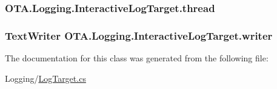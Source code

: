 \subsubsection[{thread}]{ O\+T\+A.\+Logging.\+Interactive\+Log\+Target.\+thread\hspace{0.3cm}{\ttfamily [protected]}}\label{class_o_t_a_1_1_logging_1_1_interactive_log_target_a9575af8474322f89afa9bcc6618d8b48}
\hypertarget{class_o_t_a_1_1_logging_1_1_interactive_log_target_a5d351f6ef26b84b2efa11a3b79c096f3}{}
\subsubsection[{writer}]{\setlength{\rightskip}{0pt plus 5cm}Text\+Writer O\+T\+A.\+Logging.\+Interactive\+Log\+Target.\+writer\hspace{0.3cm}{\ttfamily [protected]}}\label{class_o_t_a_1_1_logging_1_1_interactive_log_target_a5d351f6ef26b84b2efa11a3b79c096f3}


The documentation for this class was generated from the following file\+:\begin{DoxyCompactItemize}
\item 
Logging/\hyperlink{_log_target_8cs}{Log\+Target.\+cs}\end{DoxyCompactItemize}
